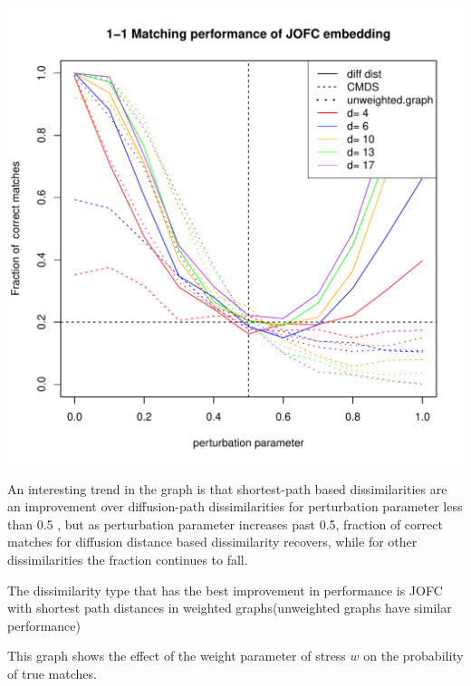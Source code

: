 \documentclass[11pt]{article} %
\begin{document}
\begin{knitrout}
\color{fgcolor}\includegraphics{graphs/FidCommPapergraph-plot-3} 
\end{knitrout}



An interesting trend in the graph is that shortest-path based dissimilarities are an improvement over diffusion-path dissimilarities for perturbation parameter less than 0.5 , but as perturbation parameter increases past 0.5, fraction of correct matches for diffusion distance based dissimilarity recovers, while for other dissimilarities the fraction continues to fall. 

The dissimilarity type that has the best improvement in performance is JOFC with shortest path distances in weighted graphs(unweighted graphs have similar performance)




This graph shows the effect of the weight parameter of stress $w$ on the probability of true matches.
\end{document}
